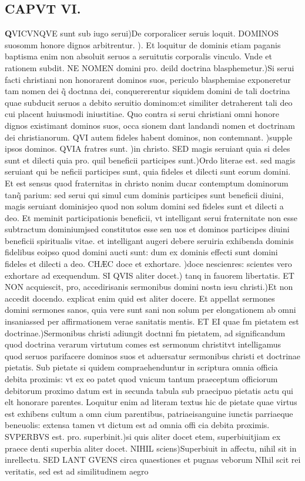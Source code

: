 \documentclass{article}
\begin{document}
\begin{pages}
\endnumbering\beginnumbering\section{CAPVT VI.}\pstart \huge\textbf{Q}\normalsize VICVNQVE sunt sub iugo serui)De corporalicer seruis loquit. DOMINOS suosomm honore dignos arbitrentur. ). Et loquitur de dominis etiam paganis baptisma enim non absoluit seruos a seruitutis corporalis vinculo. Vnde et rationem subdit. NE NOMEN domini pro. deild doctrina blasphemetur.)Si serui facti christiani non honorarent dominos suos, periculo blasphemiae exponeretur tam nomen dei q̃ doctnna dei, conquererentur siquidem domini de tali doctrina quae subducit seruos a debito seruitio dominom:et similiter detraherent tali deo cui placent huiusmodi iniustitiae. Quo contra si serui christiani omni honore dignos existimant dominos suos, occa sionem dant landandi nomen et doctrinam dei christianorum. QVI autem fideles habent dominos, non contemnant. )supple ipsos dominos. QVIA fratres sunt. )in christo. SED magis seruiant quia si deles sunt et dilecti quia pro. quil beneficii participes sunt.)Ordo literae est. sed magis seruiant qui be neficii participes sunt, quia fideles et dilecti sunt eorum domini. Et est sensus quod fraternitas in christo nonim ducar contemptum dominorum tanq̃ parium: sed serui qui simul cum dominis participes sunt beneficii diuini, magis seruiant dominisjeo quod non solum domini sed fideles sunt et dilecti a deo. Et meminit participationis beneficii, vt intelligant serui fraternitate non esse subtractum dominiumjsed constitutos esse sen uos et dominos participes diuini beneficii spiritualis vitae. et intelligant augeri debere seruiria exhibenda dominis fidelibus eoipso quod domini aucti sunt: dum ex dominis effecti sunt domini fideles et dilecti a deo. CHÆC doce et exhortare. )doce nescienres: scientes vero exhortare ad exequendum. SI QVIS aliter docet.) tanq in fauorem libertatis. ET NON acquiescit, pro, accedirisanis sermonibus domini nostn iesu christi.)Et non accedit docendo. explicat enim quid est aliter docere. Et appellat sermones domini sermones sanos, quia vere sunt sani non solum per elongationem ab omni insaniassed per affirmationem verae sanitatis mentis. ET EI quae fm pietatem est doctrinae.)Sermonibus christi adiungit doctnni fm pietatem, ad significandum quod doctrina verarum virtutum comes est sermonum christitvt intelligamus quod seruos parifacere dominos suos et aduersatur sermonibus christi et doctrinae pietatis. Sub pietate si quidem compraehenduntur in scriptura omnia officia debita proximis: vt ex eo patet quod vnicum tantum praeceptum officiorum debitorum proximo datum est in secunda tabula sub praecipuo pietatis actu qui elt honorare parentes. Loquitur enim ad literam textus hic de pietate quae virtus est exhibens cultum a omn cium parentibus, patriaeisanguine iunctis parriaeque beneuolis: extensa tamen vt dictum est ad omnia offi cia debita proximis. SVPERBVS est. pro. superbinit.)si quis aliter docet etem, superbiuitjiam ex praece denti superbia aliter docet. NIHIL sciens)Superbiuit in affectu, nihil sit in inrellectu. SED LANT GVENS circa quaestiones et pugnas veborum NIhil scit rei veritatis, sed est ad similitudinem aegro\pend

\end{pages}
\end{document}
